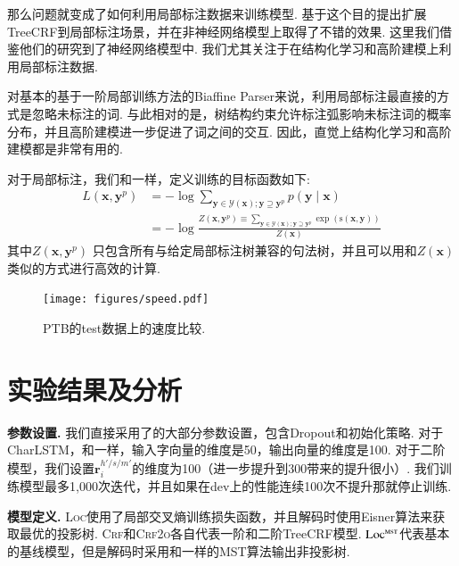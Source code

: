 那么问题就变成了如何利用局部标注数据来训练模型.
\citet{li-etal-2016-active}基于这个目的提出扩展TreeCRF到局部标注场景，并在非神经网络模型上取得了不错的效果.
这里我们借鉴他们的研究到了神经网络模型中.
我们尤其关注于在结构化学习和高阶建模上利用局部标注数据.

对基本的基于一阶局部训练方法的Biaffine Parser来说，利用局部标注最直接的方式是忽略未标注的词.
与此相对的是，树结构约束允许标注弧影响未标注词的概率分布，并且高阶建模进一步促进了词之间的交互.
因此，直觉上结构化学习和高阶建模都是非常有用的.

对于局部标注，我们和\citet{li-etal-2016-active}一样，定义训练的目标函数如下:
\begin{equation}
  \label{eq:training-loss-treecrf-partial}
  \begin{split}
    \mathit{L}(\boldsymbol{x}, {\boldsymbol{y}^p}) &= -\log \sum\limits_{\boldsymbol{y} \in \mathcal{Y}(\boldsymbol{x}); \boldsymbol{y} \supseteq {\boldsymbol{y}^p}} p(\boldsymbol{y}\mid\boldsymbol{x})  \\
    &= - \log \frac{Z(\boldsymbol{x}, {\boldsymbol{y}^p}) \equiv \sum\limits_{\boldsymbol{y} \in \mathcal{Y}(\boldsymbol{x}); \boldsymbol{y} \supseteq \boldsymbol{y}^p} \exp(\mathrm{s}(\boldsymbol{x},\boldsymbol{y}))}{Z(\boldsymbol{x})}
  \end{split}
\end{equation}
其中$Z(\boldsymbol{x}, {\boldsymbol{y}^p})$ 只包含所有与给定局部标注树兼容的句法树，并且可以用和$Z(\boldsymbol{x})$类似的方式进行高效的计算.

\begin{figure}[tb]
  \centering
  \texttt{[image: figures/speed.pdf]}
  \caption{
    PTB的test数据上的速度比较.
  }
  \label{fig:speed}
\end{figure}

\section{实验结果及分析}\label{sec:dep-exps}



\noindent\textbf{参数设置.}
我们直接采用了\citet{dozat-etal-2017-biaffine}的大部分参数设置，包含Dropout和初始化策略.
对于CharLSTM，和\citet{lample-etal-2016-neural}一样，输入字向量的维度是50，输出向量的维度是100.
对于二阶模型，我们设置$\mathbf{r}^{h'/s/m'}_i$的维度为100（进一步提升到300带来的提升很小）.
我们训练模型最多1,000次迭代，并且如果在dev上的性能连续100次不提升那就停止训练.

\noindent\textbf{模型定义.}
\textsc{Loc}使用了局部交叉熵训练损失函数，并且解码时使用Eisner算法来获取最优的投影树.
\textsc{Crf}和\textsc{Crf2o}各自代表一阶和二阶TreeCRF模型.
$\textsc{Loc}^{\textsc{mst}}$代表基本的基线模型，但是解码时采用和\citet{dozat-etal-2017-biaffine}一样的MST算法输出非投影树.

